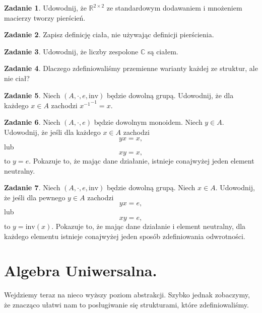 \documentclass{book}
\theoremstyle{definition}
\newtheorem{exercise}{Zadanie}[section]
\begin{document}
\begin{exercise}
	Udowodnij,
		że $\mathbb{R}^{2 \times 2}$ ze standardowym dodawaniem i mnożeniem macierzy tworzy pierścień.
\end{exercise}

\begin{exercise}
	Zapisz definicję ciała, nie używając definicji pierścienia.
\end{exercise}

\begin{exercise}
	Udowodnij, że liczby zespolone $\mathbb{C}$ są ciałem.
\end{exercise}

\begin{exercise}
	Dlaczego zdefiniowaliśmy przemienne warianty każdej ze struktur, ale nie ciał?
\end{exercise}

\begin{exercise}
    Niech $(A, \cdot, e, \mathrm{inv})$ będzie dowolną grupą.
    Udowodnij, że dla każdego $x \in A$ zachodzi ${x^{-1}}^{-1} = x$.
\end{exercise}

\begin{exercise}
    Niech $(A, \cdot, e)$ będzie dowolnym monoidem.
	Niech $y \in A$.
    Udowodnij, że jeśli dla każdego $x \in A$ zachodzi
	\begin{equation}
        yx = x,
	\end{equation}
	lub
	\begin{equation}
        xy = x,
	\end{equation}
    to $y = e$.
    Pokazuje to,
		że mając dane działanie,
		istnieje conajwyżej jeden element neutralny.
\end{exercise}

\begin{exercise}
    Niech $(A, \cdot, e, \mathrm{inv})$ będzie dowolną grupą.
	Niech $x \in A$.
    Udowodnij, że jeśli dla pewnego $y \in A$ zachodzi
	\begin{equation}
        yx = e,
	\end{equation}
	lub
	\begin{equation}
        xy = e,
	\end{equation}
    to $y = \mathrm{inv}(x)$.
    Pokazuje to,
		że mając dane działanie i element neutralny,
        dla każdego elementu istnieje conajwyżej jeden sposób zdefiniowania odwrotności.
\end{exercise}

\section{Algebra Uniwersalna.}
Wejdziemy teraz na nieco wyższy poziom abstrakcji.
Szybko jednak zobaczymy,
że znacząco ułatwi nam to posługiwanie się strukturami,
które zdefiniowaliśmy.
\end{document}
